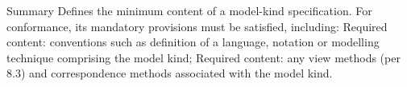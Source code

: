 \documentclass[10pt,letterpaper]{article}
\begin{document}
\begin{CornellSummaryBox}{Summary}
Defines the minimum content of a model-kind specification. For conformance, its mandatory provisions must be satisfied, including: Required content: conventions such as definition of a language, notation or modelling technique comprising the model kind; Required content: any view methods (per 8.3) and correspondence methods associated with the model kind.
\end{CornellSummaryBox}
\end{document}
